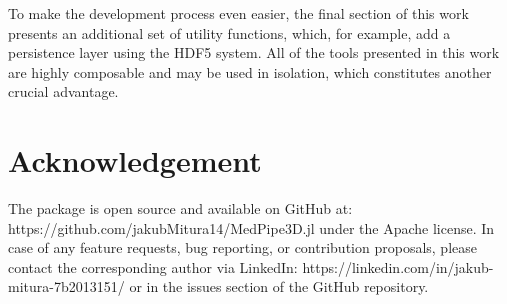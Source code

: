 \documentclass{juliacon}
\begin{document}
To make the development process even easier, the final section of this work presents an additional set of utility functions, which, for example, add a persistence layer  using the HDF5 system. All of the tools presented in this work are highly composable and may be used in isolation, which constitutes another crucial advantage. 

\section{Acknowledgement}
The package is open source and available on GitHub at: https://github.com/jakubMitura14/MedPipe3D.jl under the Apache license. In case of any feature requests, bug reporting, or contribution proposals, please contact the corresponding author via LinkedIn: https://linkedin.com/in/jakub-mitura-7b2013151/ or in the issues section of the GitHub repository.





\end{document}
